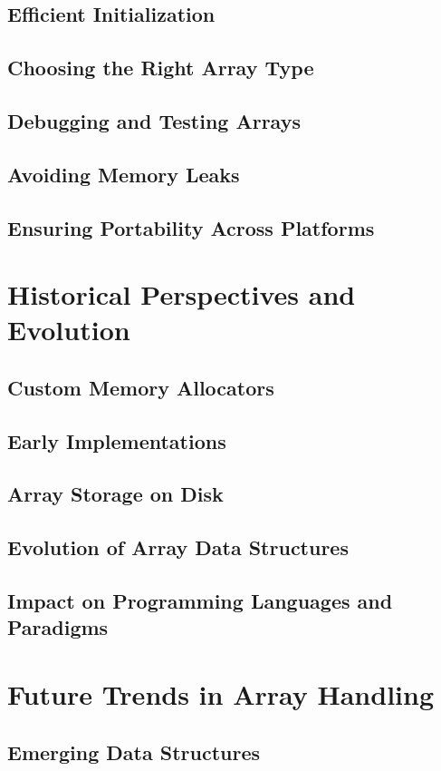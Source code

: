 \documentclass[12pt, oneside]{book}
\begin{document}
	\section{Efficient Initialization}
	\section{Choosing the Right Array Type}
	\section{Debugging and Testing Arrays}
	\section{Avoiding Memory Leaks}
	\section{Ensuring Portability Across Platforms}
	
	\chapter{Historical Perspectives and Evolution}
	\section{Custom Memory Allocators}\section{Early Implementations}
	\section{Array Storage on Disk}\section{Evolution of Array Data Structures}
	\section{Impact on Programming Languages and Paradigms}
	
	\chapter{Future Trends in Array Handling}
	\section{Emerging Data Structures}
\end{document}

